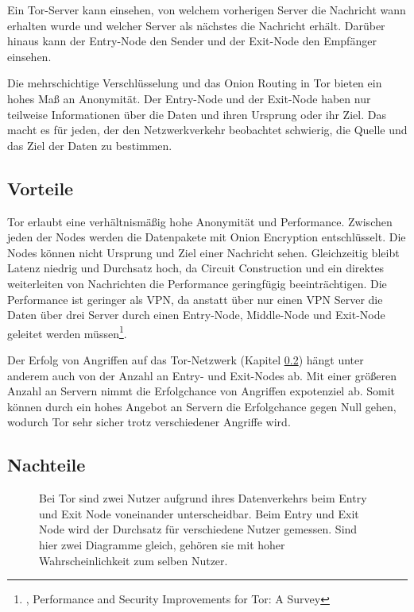 Ein Tor-Server kann einsehen, von welchem vorherigen Server die Nachricht wann erhalten wurde und welcher Server als nächstes die Nachricht erhält. Darüber hinaus kann der Entry-Node den Sender und der Exit-Node den Empfänger einsehen.

Die mehrschichtige Verschlüsselung und das Onion Routing in Tor bieten ein hohes Maß an Anonymität. Der Entry-Node und der Exit-Node haben nur teilweise Informationen über die Daten und ihren Ursprung oder ihr Ziel. Das macht es für jeden, der den Netzwerkverkehr beobachtet schwierig, die Quelle und das Ziel der Daten zu bestimmen\footnotemark{}.

\subsection{Vorteile}
\label{chap:tor_advantages}

Tor erlaubt eine verhältnismäßig hohe Anonymität und Performance. Zwischen jeden der Nodes werden die Datenpakete mit Onion Encryption entschlüsselt. Die Nodes können nicht Ursprung und Ziel einer Nachricht sehen. Gleichzeitig bleibt Latenz niedrig und Durchsatz hoch, da Circuit Construction und ein direktes weiterleiten von Nachrichten die Performance geringfügig beeinträchtigen. Die Performance ist geringer als VPN, da anstatt über nur einen VPN Server die Daten über drei Server durch einen Entry-Node, Middle-Node und Exit-Node geleitet werden müssen\footnote{\cite{PerformanceAndSecurityTor}, Performance and Security Improvements for Tor: A Survey}.

Der Erfolg von Angriffen auf das Tor-Netzwerk (Kapitel \ref{chap:tor_disatvantages}) hängt unter anderem auch von der Anzahl an Entry- und Exit-Nodes ab. Mit einer größeren Anzahl an Servern nimmt die Erfolgchance von Angriffen expotenziel ab. Somit können durch ein hohes Angebot an Servern die Erfolgchance gegen Null gehen, wodurch Tor sehr sicher trotz verschiedener Angriffe wird.

\subsection{Nachteile}
\label{chap:tor_disatvantages}

\begin{figure}[h!]
    \centering
    
    \caption{Bei Tor sind zwei Nutzer aufgrund ihres Datenverkehrs beim Entry und Exit Node voneinander unterscheidbar. Beim Entry und Exit Node wird der Durchsatz für verschiedene Nutzer gemessen. Sind hier zwei Diagramme gleich, gehören sie mit hoher Wahrscheinlichkeit zum selben Nutzer.}
    \label{imgs:tor_transfer}
\end{figure}

